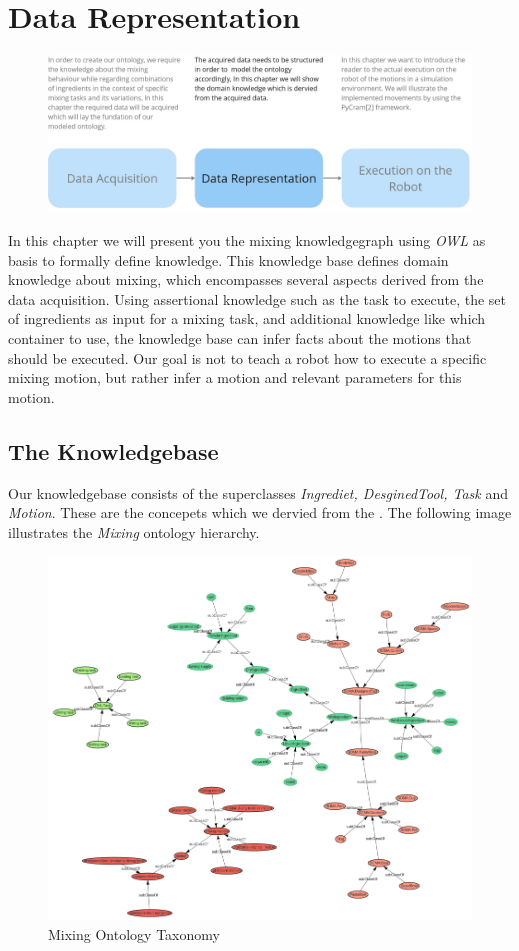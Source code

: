 \chapter{Data Representation}
\label{chap:Data_representation}
\begin{figure}[H]
    \includegraphics[scale=0.25]{Graphics/structure_overview2.jpg}
\end{figure} 
In this chapter we will present you the mixing knowledgegraph using \textit{OWL} as basis to formally define knowledge.
This knowledge base defines domain knowledge about mixing, which encompasses several aspects derived from the data acquisition.
Using assertional knowledge such as the task to execute, the set of ingredients as input for a mixing task, 
and additional knowledge like which container to use, the knowledge base can infer facts about the motions that should be executed.
Our goal is not to teach a robot how to execute a specific mixing motion, but rather infer a motion and relevant parameters for this motion. 
\section{The Knowledgebase}
Our knowledgebase consists of the superclasses \textit{Ingrediet, DesginedTool, Task} and \textit{Motion}. These are the concepets which we dervied from the . The following image illustrates the \textit{Mixing} ontology hierarchy.
\begin{figure}[H]
    \includegraphics[scale=0.5]{Graphics/classHierarchy/taxonomy.png}
    \centering
    \caption{Mixing Ontology Taxonomy}
\end{figure}

